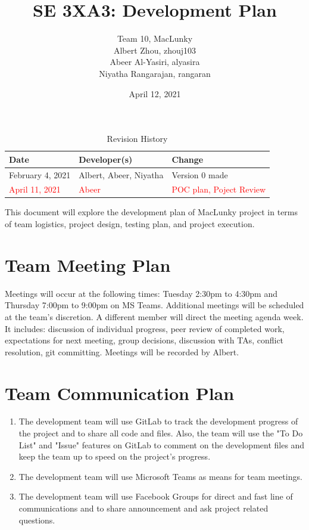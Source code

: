 \documentclass{article}
\title{SE 3XA3: Development Plan}
\author{Team 10, MacLunky
		\\ Albert Zhou, zhouj103
		\\Abeer Al-Yasiri, alyasira
		\\ Niyatha Rangarajan, rangaran
}
\date{April 12, 2021}
\begin{document}
\begin{table}[hp]
\caption{Revision History} \label{TblRevisionHistory}
\begin{tabularx}{\textwidth}{llX}
\toprule
\textbf{Date} & \textbf{Developer(s)} & \textbf{Change}\\
\midrule
February 4, 2021 & Albert, Abeer, Niyatha & Version 0 made\\
\hline
\textcolor{red}{April 11, 2021} & \textcolor{red}{Abeer} & \textcolor{red}{POC plan, Poject Review}\\
\bottomrule
\end{tabularx}
\end{table}


\newpage

\maketitle

This document will explore the development plan of MacLunky project in terms of team logistics, project design, testing plan, and project execution.

\section{Team Meeting Plan}

Meetings will occur at the following times: Tuesday 2:30pm to 4:30pm and Thursday 7:00pm to 9:00pm on MS Teams. Additional meetings will be scheduled at the team's discretion. A different member will direct the meeting agenda week. It includes: discussion of individual progress, peer review of completed work, expectations for next meeting, group decisions, discussion with TAs, conflict resolution, git committing. Meetings will be recorded by Albert.

\section{Team Communication Plan}

\begin{enumerate}
    \item The development team will use GitLab to track the development progress of the project and to share all code and files. Also, the team will use the "To Do List" and "Issue" features on GitLab to comment on the development files and keep the team up to speed on the project's progress.
    \item The development team will use Microsoft Teams as means for team meetings. 
    \item The development team will use Facebook Groups for direct and fast line of communications and to share announcement and ask project related questions.
\end{enumerate}
\end{document}
